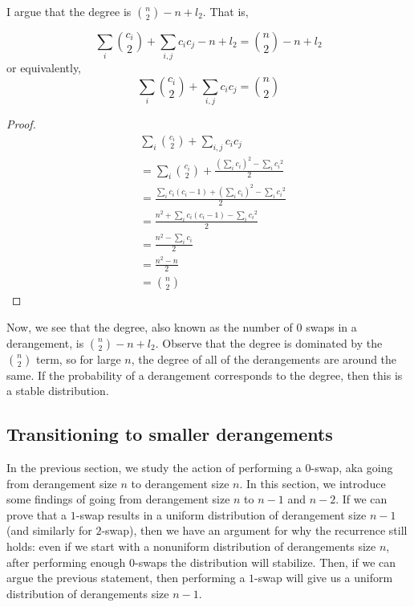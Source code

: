 \documentclass{article}
\begin{document}
I argue that the degree is ${n \choose 2} - n + l_2$. That is,

\[
    \sum_{i}{c_i \choose 2} + \sum_{i, j}{{c_i}{c_j}} - n + l_2 = {n \choose 2} - n  + l_2
\]
or equivalently,
\[
    \sum_{i}{c_i \choose 2} + \sum_{i, j}{{c_i}{c_j}} = {n \choose 2}
\]

\begin{proof}
        \begin{align}
            & \sum_{i}{c_i \choose 2} + \sum_{i, j}{{c_i}{c_j}}  \\\nonumber
            &=  \sum_{i}{c_i \choose 2} + \frac{(\sum_{i}{c_i})^2 - \sum_{i}{{c_i}^2}}{2} \\\nonumber
            &=  \frac{\sum_{i}{c_i(c_i -1)} + (\sum_{i}{c_i})^2 - \sum_{i}{{c_i}^2}}{2} \\\nonumber
            &=  \frac{n^2 + \sum_{i}{c_i(c_i - 1)} - \sum_{i}{{c_i}^2}}{2} \\\nonumber
            &=  \frac{n^2 - \sum_{i}{c_i}}{2} \\\nonumber
            &=  \frac{n^2 - n}{2} \\\nonumber
            &=  {n \choose 2}
        \end{align}
\end{proof}

Now, we see that the degree, also known as the number of 0 swaps in a derangement, is ${n \choose 2} - n + l_2 $.
Observe that the degree is dominated by the ${n \choose 2}$ term, so for large $n$, the degree of all of the
derangements are around the same. If the probability of a derangement corresponds to the degree, then this is a stable distribution.

\subsection{Transitioning to smaller derangements}
In the previous section, we study the action of performing a $0$-swap, aka going from derangement
size $n$ to derangement size $n$. In this section, we introduce some findings of going from
derangement size $n$ to $n - 1$ and $n - 2$. If we can prove that a $1$-swap
results in a uniform distribution of derangement size $n - 1$ (and similarly for $2$-swap), then we have
an argument for why the recurrence still holds: even if we start with a nonuniform distribution of
derangements size $n$, after performing enough $0$-swaps the distribution will stabilize. Then,
if we can argue the previous statement, then performing a $1$-swap will give us a uniform distribution
of derangements size $n - 1$.
\end{document}
